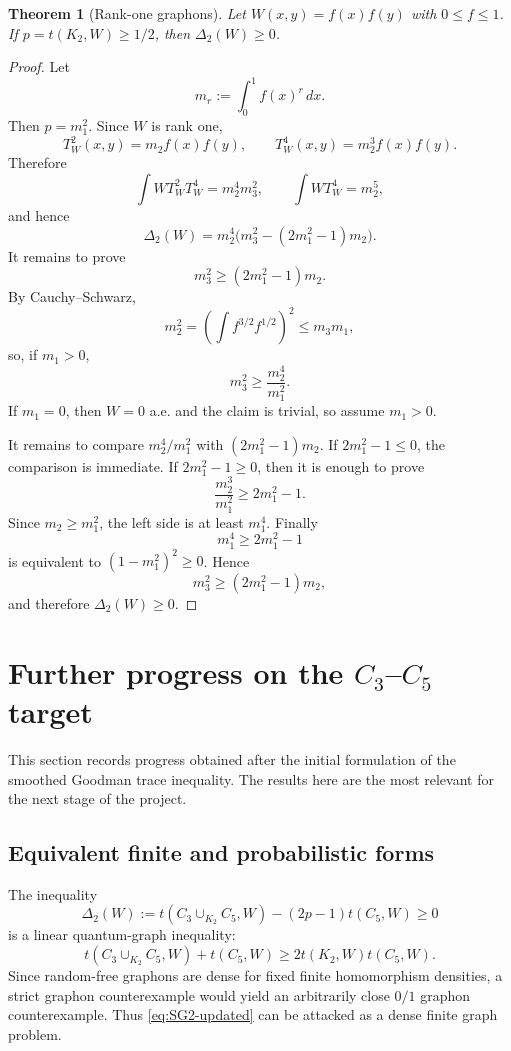 \documentclass[11pt]{article}
\newtheorem{theorem}{Theorem}[section]
\theoremstyle{definition}
\begin{document}
\begin{theorem}[Rank-one graphons]\label{thm:rank-one-SG2}
Let $W(x,y)=f(x)f(y)$ with $0\le f\le1$.  If $p=t(K_2,W)\ge1/2$, then $\Delta_2(W)\ge0$.
\end{theorem}

\begin{proof}
Let
\[
  m_r:=\int_0^1 f(x)^r\,dx.
\]
Then $p=m_1^2$.  Since $W$ is rank one,
\[
  T_W^2(x,y)=m_2 f(x)f(y),
  \qquad
  T_W^4(x,y)=m_2^3 f(x)f(y).
\]
Therefore
\[
  \int WT_W^2T_W^4=m_2^4m_3^2,
  \qquad
  \int WT_W^4=m_2^5,
\]
and hence
\[
  \Delta_2(W)=m_2^4\bigl(m_3^2-(2m_1^2-1)m_2\bigr).
\]
It remains to prove
\[
  m_3^2\ge (2m_1^2-1)m_2.
\]
By Cauchy--Schwarz,
\[
  m_2^2=\left(\int f^{3/2}f^{1/2}\right)^2\le m_3m_1,
\]
so, if $m_1>0$,
\[
  m_3^2\ge \frac{m_2^4}{m_1^2}.
\]
If $m_1=0$, then $W=0$ a.e. and the claim is trivial, so assume $m_1>0$.

It remains to compare $m_2^4/m_1^2$ with $(2m_1^2-1)m_2$.  If $2m_1^2-1\le0$, the comparison is immediate.  If $2m_1^2-1\ge0$, then it is enough to prove
\[
  \frac{m_2^3}{m_1^2}\ge 2m_1^2-1.
\]
Since $m_2\ge m_1^2$, the left side is at least $m_1^4$.  Finally
\[
  m_1^4\ge 2m_1^2-1
\]
is equivalent to $(1-m_1^2)^2\ge0$.  Hence
\[
  m_3^2\ge (2m_1^2-1)m_2,
\]
and therefore $\Delta_2(W)\ge0$.
\end{proof}


\section{Further progress on the $C_3$--$C_5$ target}
\label{sec:further-SG2}

This section records progress obtained after the initial formulation of the smoothed Goodman trace inequality.  The results here are the most relevant for the next stage of the project.

\subsection{Equivalent finite and probabilistic forms}

The inequality
\begin{equation}\label{eq:SG2-updated}
  \Delta_2(W):=t(C_3\cup_{K_2}C_5,W)-(2p-1)t(C_5,W)\ge0
\end{equation}
is a linear quantum-graph inequality:
\[
  t(C_3\cup_{K_2}C_5,W)+t(C_5,W)
  \ge 2t(K_2,W)t(C_5,W).
\]
Since random-free graphons are dense for fixed finite homomorphism densities, a strict graphon counterexample would yield an arbitrarily close $0/1$ graphon counterexample.  Thus \eqref{eq:SG2-updated} can be attacked as a dense finite graph problem.
\end{document}
